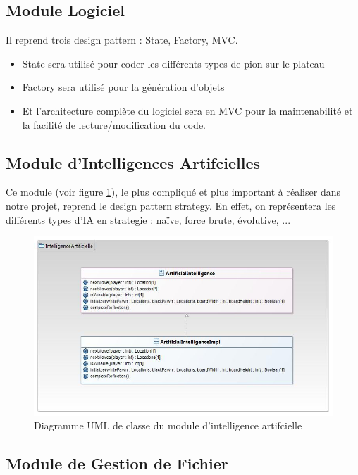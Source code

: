\documentclass[a4paper,12pt]{article}
\begin{document}
\subsection{Module Logiciel}

Il reprend trois design pattern : State, Factory, MVC.
\begin{itemize}
  \item State sera utilisé pour coder les différents types de pion sur le plateau
  \item Factory sera utilisé pour la génération d’objets
  \item Et l’architecture complète du logiciel sera en MVC pour la maintenabilité et la facilité de lecture/modification du code.
\end{itemize}



\subsection{Module d'Intelligences Artifcielles}

Ce module (voir figure \ref{ia}), le plus compliqué et plus important à réaliser dans notre projet, reprend le design pattern strategy. En effet, on représentera les différents types d’IA en strategie : naïve, force brute, évolutive, ...

\begin{figure}[H]
\includegraphics[scale=0.65]{IntelligenceArtificielle.jpg}
\caption{Diagramme UML de classe du module d'intelligence artifcielle}
\label{ia}
\end{figure}

\subsection{Module de Gestion de Fichier}
\end{document}
